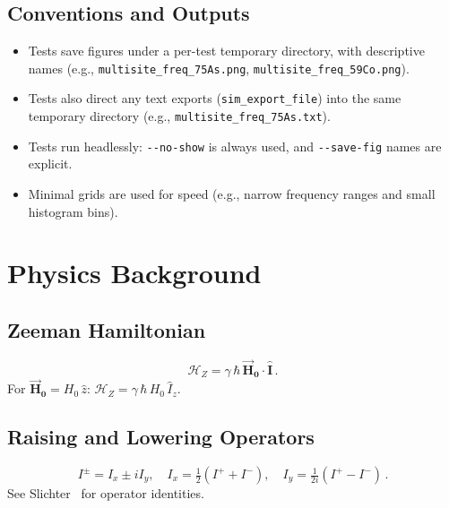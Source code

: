 \documentclass[12pt]{article}
\begin{document}
\subsection{Conventions and Outputs}
\begin{itemize}
  \item Tests save figures under a per-test temporary directory, with descriptive names (e.g., \verb|multisite_freq_75As.png|, \verb|multisite_freq_59Co.png|).
  \item Tests also direct any text exports (\verb|sim_export_file|) into the same temporary directory (e.g., \verb|multisite_freq_75As.txt|).
  \item Tests run headlessly: \verb|--no-show| is always used, and \verb|--save-fig| names are explicit.
  \item Minimal grids are used for speed (e.g., narrow frequency ranges and small histogram bins).
\end{itemize}

\section{Physics Background}

\subsection{Zeeman Hamiltonian}
\begin{equation}
\mathcal{H}_Z = \gamma\,\hbar\,\vec{\mathbf{H}}_{\mathbf{0}}\cdot\hat{\mathbf{I}}\,.
\end{equation}
For \(\vec{\mathbf{H}}_{\mathbf{0}} = H_0\,\hat{z}\): \(\mathcal{H}_Z = \gamma\,\hbar\,H_0\,\hat{I}_z\).

\subsection{Raising and Lowering Operators}
\begin{equation}
I^\pm = I_x \pm i I_y,\quad I_x = \tfrac{1}{2}(I^+ + I^-),\quad I_y = \tfrac{1}{2i}(I^+ - I^-)\,.
\end{equation}
See Slichter~\cite{Slichter:1996wo} for operator identities.
\end{document}
